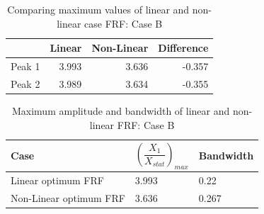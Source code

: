 \begin{table}[h!]
\centering
\caption{Comparing maximum values of linear and non-linear case FRF: Case B}
\begin{tabular}{|r|r|r|r|}
\hline
 & Linear & Non-Linear & Difference \\ \hline
Peak 1& 3.993 & 3.636 & -0.357\\
Peak 2 & 3.989  & 3.634 & -0.355\\ \hline
\end{tabular}
\end{table}

\begin{table}[h!]
\centering
\caption{Maximum amplitude and bandwidth of linear and non-linear FRF: Case B}
\begin{tabular}{|m{6cm}|m{2cm}|m{2cm}|}
\hline
Case& $\left(\dfrac{X_{1}}{X_{stat}}\right)_{max}$ & Bandwidth \\
\hline
Linear optimum FRF & 3.993 & 0.22 

\\
\hline
Non-Linear optimum FRF & 3.636 & 0.267

 \\ 
\hline
\end{tabular}
\end{table}